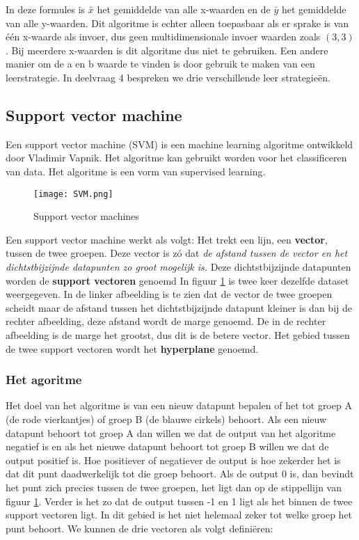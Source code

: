 In deze formules is $\bar{x}$ het gemiddelde van alle x-waarden en de $\bar{y}$ het gemiddelde van alle y-waarden. 
Dit algoritme is echter alleen toepasbaar als er sprake is van \'{e}\'{e}n x-waarde als invoer, dus geen multidimensionale invoer waarden zoals $(3,3)$. Bij meerdere x-waarden is dit algoritme dus niet te gebruiken. Een andere manier om de a en b waarde te vinden is door gebruik te maken van een leerstrategie. In deelvraag 4 bespreken we drie verschillende leer strategieën.

\subsection{Support vector machine}
Een support vector machine (SVM) is een machine learning algoritme ontwikkeld door Vladimir Vapnik. Het algoritme kan gebruikt worden voor het classificeren van data. Het algoritme is een vorm van supervised learning. \cite{SVM}

\begin{figure}[h]
  \centering
    \texttt{[image: SVM.png]}
  \caption{Support vector machines}
  \label{fig:SupVectorMachine1}
\end{figure}

Een support vector machine werkt als volgt: Het trekt een lijn, een \textbf{vector}, tussen de twee groepen. Deze vector is z\'o dat \textit{de afstand tussen de vector en het dichtstbijzijnde datapunten zo groot mogelijk is.} \cite{SVM2} Deze dichtstbijzijnde datapunten worden de \textbf{support vectoren} genoemd In figuur \ref{fig:SupVectorMachine1} is twee keer dezelfde dataset weergegeven. In de linker afbeelding is te zien dat de vector de twee groepen scheidt maar de afstand tussen het dichtstbijzijnde datapunt kleiner is dan bij de rechter afbeelding, deze afstand wordt de marge genoemd. De in de rechter afbeelding is de marge het grootst, dus dit is de betere vector. Het gebied tussen de twee support vectoren wordt het \textbf{hyperplane} genoemd.

\subsubsection{Het agoritme}
Het doel van het algoritme is van een nieuw datapunt bepalen of het tot groep A (de rode vierkantjes) of groep B (de blauwe cirkels) behoort. Als een nieuw datapunt behoort tot groep A dan willen we dat de output van het algoritme negatief is en als het nieuwe datapunt behoort tot groep B willen we dat de output positief is. Hoe positiever of negatiever de output is hoe zekerder het is dat dit punt daadwerkelijk tot die groep behoort. Als de output 0 is, dan bevindt het punt zich precies tussen de twee groepen, het ligt dan op de stippellijn van figuur \ref{fig:SupVectorMachine1}. Verder is het zo dat de output tussen -1 en 1 ligt als het binnen de twee support vectoren ligt. In dit gebied is het niet helemaal zeker tot welke groep het punt behoort. 
We kunnen de drie vectoren als volgt definiëren: 

